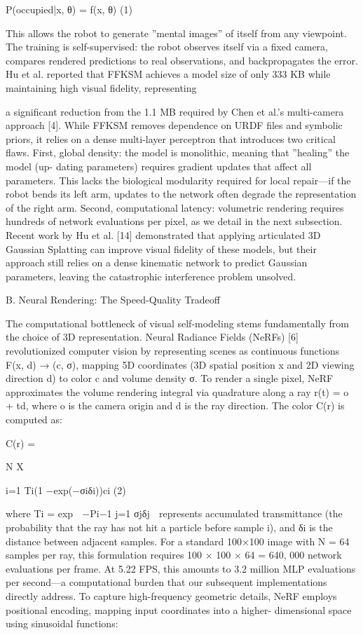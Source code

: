 \documentclass[10pt,twocolumn,letterpaper]{article}
\begin{document}
P(occupied|x, θ) = f(x, θ) (1)

This allows the robot to generate ”mental images” of itself from any viewpoint. The training is self-supervised: the robot observes itself via a fixed camera, compares rendered predictions to real observations, and backpropagates the error. Hu et al. reported that FFKSM achieves a model size of only 333 KB while maintaining high visual fidelity, representing

a significant reduction from the 1.1 MB required by Chen et al.’s multi-camera approach [4]. While FFKSM removes dependence on URDF files and symbolic priors, it relies on a dense multi-layer perceptron that introduces two critical flaws. First, global density: the model is monolithic, meaning that ”healing” the model (up- dating parameters) requires gradient updates that affect all parameters. This lacks the biological modularity required for local repair—if the robot bends its left arm, updates to the network often degrade the representation of the right arm. Second, computational latency: volumetric rendering requires hundreds of network evaluations per pixel, as we detail in the next subsection. Recent work by Hu et al. [14] demonstrated that applying articulated 3D Gaussian Splatting can improve visual fidelity of these models, but their approach still relies on a dense kinematic network to predict Gaussian parameters, leaving the catastrophic interference problem unsolved.

B. Neural Rendering: The Speed-Quality Tradeoff

The computational bottleneck of visual self-modeling stems fundamentally from the choice of 3D representation. Neural Radiance Fields (NeRFs) [6] revolutionized computer vision by representing scenes as continuous functions F(x, d) → (c, σ), mapping 5D coordinates (3D spatial position x and 2D viewing direction d) to color c and volume density σ. To render a single pixel, NeRF approximates the volume rendering integral via quadrature along a ray r(t) = o + td, where o is the camera origin and d is the ray direction. The color C(r) is computed as:

C(r) =

N X

i=1 Ti(1 −exp(−σiδi))ci (2)

where Ti = exp  −Pi−1 j=1 σjδj  represents accumulated transmittance (the probability that the ray has not hit a particle before sample i), and δi is the distance between adjacent samples. For a standard 100×100 image with N = 64 samples per ray, this formulation requires 100 × 100 × 64 = 640, 000 network evaluations per frame. At 5.22 FPS, this amounts to 3.2 million MLP evaluations per second—a computational burden that our subsequent implementations directly address. To capture high-frequency geometric details, NeRF employs positional encoding, mapping input coordinates into a higher- dimensional space using sinusoidal functions:
\end{document}
